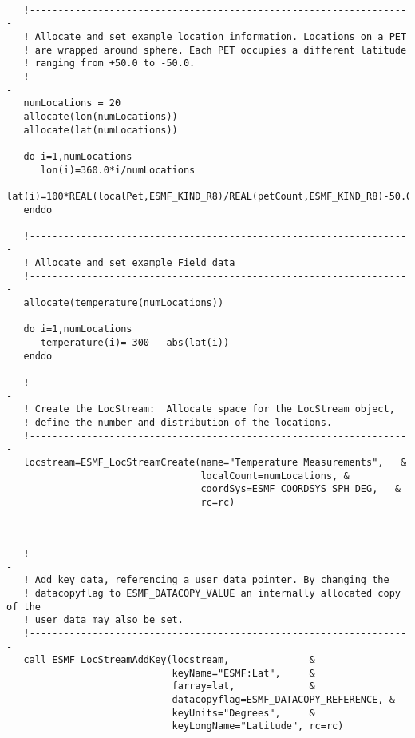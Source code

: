 
 \begin{verbatim}

   !-------------------------------------------------------------------
   ! Allocate and set example location information. Locations on a PET
   ! are wrapped around sphere. Each PET occupies a different latitude
   ! ranging from +50.0 to -50.0.
   !-------------------------------------------------------------------
   numLocations = 20
   allocate(lon(numLocations))
   allocate(lat(numLocations))

   do i=1,numLocations
      lon(i)=360.0*i/numLocations
      lat(i)=100*REAL(localPet,ESMF_KIND_R8)/REAL(petCount,ESMF_KIND_R8)-50.0
   enddo

   !-------------------------------------------------------------------
   ! Allocate and set example Field data
   !-------------------------------------------------------------------
   allocate(temperature(numLocations))

   do i=1,numLocations
      temperature(i)= 300 - abs(lat(i))
   enddo

   !-------------------------------------------------------------------
   ! Create the LocStream:  Allocate space for the LocStream object, 
   ! define the number and distribution of the locations. 
   !-------------------------------------------------------------------
   locstream=ESMF_LocStreamCreate(name="Temperature Measurements",   &
                                  localCount=numLocations, &
                                  coordSys=ESMF_COORDSYS_SPH_DEG,   &
                                  rc=rc)
 
\end{verbatim}
 

 \begin{verbatim}

   !-------------------------------------------------------------------
   ! Add key data, referencing a user data pointer. By changing the 
   ! datacopyflag to ESMF_DATACOPY_VALUE an internally allocated copy of the 
   ! user data may also be set.  
   !-------------------------------------------------------------------
   call ESMF_LocStreamAddKey(locstream,              &
                             keyName="ESMF:Lat",     &
                             farray=lat,             &
                             datacopyflag=ESMF_DATACOPY_REFERENCE, &
                             keyUnits="Degrees",     &
                             keyLongName="Latitude", rc=rc)
 
\end{verbatim}
 
